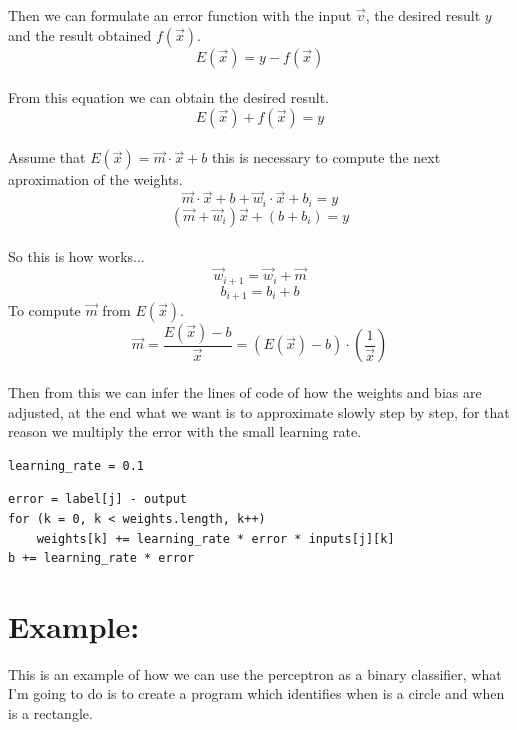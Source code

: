 \documentclass[12pt]{article}
\begin{document}
Then we can formulate an error function with the input $\vec{v}$, the desired result $y$ and the
result obtained $f(\vec{x})$.\\
\[
  E(\vec{x}) = y - f(\vec{x})
\]\\
From this equation we can obtain the desired result.\\
\[
  E(\vec{x}) + f(\vec{x}) = y
\]\\
Assume that $E(\vec{x}) = \vec{m} \cdot \vec{x} + b$ this is necessary to compute the
next aproximation of the weights.\\
\[
  \vec{m} \cdot \vec{x} + b + \vec{w}_{i} \cdot \vec{x} + b_{i} = y
\]
\[
  (\vec{m} +  \vec{w}_{i})\vec{x} + (b + b_{i}) = y
\]\\
So this is how works...
\[
  \vec{w}_{i + 1} = \vec{w}_i + \vec{m}
\]
\[
  b_{i + 1} = b_i + b
\]
To compute $\vec{m}$ from $E(\vec{x})$.\\
\[
  \vec{m} = \frac{E(\vec{x}) - b}{\vec{x}} = (E(\vec{x}) - b) \cdot (\frac{1}{\vec{x}})
\]\\
Then from this we can infer the lines of code of how the weights and bias are adjusted, at the
end what we want is to approximate slowly step by step, for that reason we multiply the error
with the small learning rate.
\begin{verbatim}
learning_rate = 0.1
\end{verbatim}
\begin{verbatim}
error = label[j] - output
for (k = 0, k < weights.length, k++)
    weights[k] += learning_rate * error * inputs[j][k]
b += learning_rate * error
\end{verbatim}
\section{Example:}
This is an example of how we can use the perceptron as a binary classifier, what I'm going to do
is to create a program which identifies when is a circle and when is a rectangle.
\end{document}
